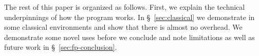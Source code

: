 The rest of this paper is organized as follows.  First, we explain the
technical underpinnings of how the program works.  In
\S~\ref{sec:classical} we demonstrate
\freeprocessing{} in some classical environments and show that there
is almost no overhead.  We demonstrate some novel uses
before we conclude and note limitations as well as future work in
\S~\ref{sec:fp-conclusion}.

%




